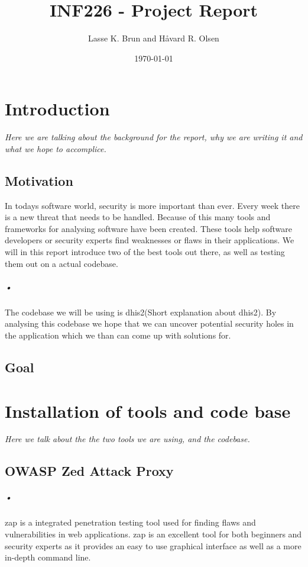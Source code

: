 \documentclass[11pt,english,a4paper]{report}
\title{INF226 - Project Report}
\date{\today}
\author{Lasse K. Brun and Håvard R. Olsen}
\begin{document}
\maketitle


\chapter{Introduction}
\textit{Here we are talking about the background for the report, why we are writing it and what we hope to accomplice.}

\section{Motivation}
In todays software world, security is more important than ever. Every week there is a new threat that needs to be handled. Because of this many tools and frameworks for analysing software have been created. These tools help software developers or security experts find weaknesses or flaws in their applications. We will in this report introduce two of the best tools out there, as well as testing them out on a actual codebase. 
\paragraph{•}
The codebase we will be using is dhis2(Short explanation about dhis2). By analysing this codebase we hope that we can uncover potential security holes in the application which we than can come up with solutions for.

\section{Goal}
\chapter{Installation of tools and code base}
\textit{Here we talk about the the two tools we are using, and the codebase.}
\section{OWASP Zed Attack Proxy}
\paragraph{•}
\gls{zap} is a integrated penetration testing tool used for finding flaws and vulnerabilities in web applications. \gls{zap} is an excellent tool for both beginners and security experts as it provides an easy to use graphical interface as well as a more in-depth command line.
\end{document}
